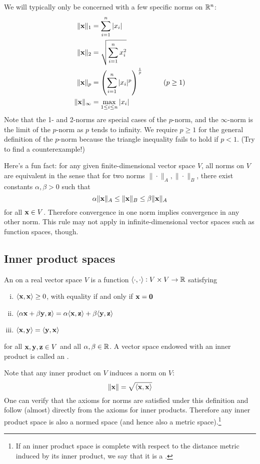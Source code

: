 We will typically only be concerned with a few specific norms on $\mathbb{R}^n$:
\begin{align*}
\|\x\|_1 &= \sum_{i=1}^n |x_i| \\
\|\x\|_2 &= \sqrt{\sum_{i=1}^n x_i^2} \\
\|\x\|_p &= \left(\sum_{i=1}^n |x_i|^p\right)^\frac{1}{p} \tab\tab (p \geq 1) \\
\|\x\|_\infty &= \max_{1 \leq i \leq n} |x_i|
\end{align*}
Note that the 1- and 2-norms are special cases of the $p$-norm, and the $\infty$-norm is the limit of the $p$-norm as $p$ tends to infinity.
We require $p \geq 1$ for the general definition of the $p$-norm because the triangle inequality fails to hold if $p < 1$.
(Try to find a counterexample!)

Here's a fun fact: for any given finite-dimensional vector space $V$, all norms on $V$ are equivalent in the sense that for two norms $\|\cdot\|_A, \|\cdot\|_B$, there exist constants $\alpha, \beta > 0$ such that
\[\alpha\|\mathbf{x}\|_A \leq \|\mathbf{x}\|_B \leq \beta\|\mathbf{x}\|_A\]
for all $\mathbf{x} \in V$. Therefore convergence in one norm implies convergence in any other norm.
This rule may not apply in infinite-dimensional vector spaces such as function spaces, though.

\subsection{Inner product spaces}
An  on a real vector space $V$ is a function $\langle \cdot, \cdot \rangle : V \times V \to \mathbb{R}$ satisfying
\begin{enumerate}[(i)]
\item $\langle \mathbf{x}, \mathbf{x} \rangle \geq 0$, with equality if and only if $\mathbf{x} = \mathbf{0}$
\item $\langle \alpha\mathbf{x} + \beta\mathbf{y}, \mathbf{z} \rangle = \alpha\langle \mathbf{x}, \mathbf{z} \rangle + \beta\langle \mathbf{y}, \mathbf{z} \rangle$
\item $\langle \mathbf{x}, \mathbf{y} \rangle = \langle \mathbf{y}, \mathbf{x} \rangle$
\end{enumerate}
for all $\mathbf{x}, \mathbf{y}, \mathbf{z} \in V$ and all $\alpha,\beta \in \mathbb{R}$.
A vector space endowed with an inner product is called an .

Note that any inner product on $V$ induces a norm on $V$:
\[\|\mathbf{x}\| = \sqrt{\langle \mathbf{x}, \mathbf{x} \rangle}\]
One can verify that the axioms for norms are satisfied under this definition and follow (almost) directly from the axioms for inner products.
Therefore any inner product space is also a normed space (and hence also a metric space).\footnote{
    If an inner product space is complete with respect to the distance metric induced by its inner product, we say that it is a .
}

